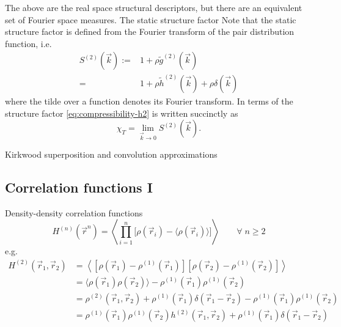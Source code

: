 The above are the real space structural descriptors, but there are an equivalent set of Fourier space measures.
The static structure factor
Note that the static structure factor is defined from the Fourier transform of the pair distribution function, i.e.\
\begin{equation}\label{eq:static-structure-factor}
  \begin{split}
    S^{(2)}(\vec{k})
    :=&
    1 + \rho \tilde{g}^{(2)}(\vec{k})
    \\ =&
    1 + \rho \tilde{h}^{(2)}(\vec{k}) + \rho \delta(\vec{k})
  \end{split}
\end{equation}
where the tilde over a function denotes its Fourier transform.
In terms of the structure factor \eqref{eq:compressibility-h2} is written succinctly as%
\begin{equation}
  \chi_T = \lim_{\vec{k} \to 0} S^{(2)}(\vec{k}).
\end{equation}

Kirkwood superposition and convolution approximations

\subsection{Correlation functions I}

Density-density correlation functions
\begin{equation}\label{eq:density-density-correlations}
  H^{(n)}(\vec{r}^n)
  =
  \left\langle
  \prod_{i=1}^n
  \Big[ \rho(\vec{r}_i) - \big\langle\rho(\vec{r}_i)\big\rangle \Big]
  \right\rangle
  \qquad \forall \; n \ge 2
\end{equation}
e.g.\
\begin{equation}
  \begin{aligned}
    H^{(2)}(\vec{r}_1, \vec{r}_2) &=
    \left\langle
    \left[ \rho(\vec{r}_1) - \rho^{(1)}(\vec{r}_1) \right]
    \left[ \rho(\vec{r}_2) - \rho^{(1)}(\vec{r}_2) \right]
    \right\rangle \\
    &=
    \big\langle \rho(\vec{r}_1) \rho(\vec{r}_2) \big\rangle -
    \rho^{(1)}(\vec{r}_1) \rho^{(1)}(\vec{r}_2) \\
    &=
    \rho^{(2)}(\vec{r}_1, \vec{r}_2) +
    \rho^{(1)}(\vec{r}_1) \delta(\vec{r}_1 - \vec{r}_2) -
    \rho^{(1)}(\vec{r}_1) \rho^{(1)}(\vec{r}_2) \\
    &=
    \rho^{(1)}(\vec{r}_1) \rho^{(1)}(\vec{r}_2) h^{(2)}(\vec{r}_1, \vec{r}_2)
    +
    \rho^{(1)}(\vec{r}_1) \delta(\vec{r}_1 - \vec{r}_2)
  \end{aligned}
\end{equation}

